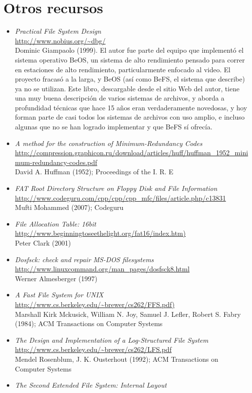 \documentclass[11pt,fleqn]{book} %
\newcommand{\otrorec}[1]{ \\ {\small \url{#1}} \\ }
\begin{document}
\section{Otros recursos}
\label{sec-7-4}
\label{FS_otros_recursos}


\begin{itemize}
\item \emph{Practical File System Design}
  \otrorec{http://www.nobius.org/~dbg/}
  Dominic Giampaolo (1999). El autor fue parte del equipo que
  implementó el sistema operativo BeOS, un sistema de alto rendimiento
  pensado para correr en estaciones de alto rendimiento,
  particularmente enfocado al video. El proyecto fracasó a la larga, y
  BeOS (así como BeFS, el sistema que describe) ya no se
  utilizan. Este libro, descargable desde el sitio Web del autor,
  tiene una muy buena descripción de varios sistemas de archivos, y
  aborda a profundidad técnicas que hace 15 años eran verdaderamente
  novedosas, y hoy forman parte de casi todos los sistemas de archivos
  con uso amplio, e incluso algunas que no se han logrado implementar
  y que BeFS sí ofrecía.
\item \emph{A method for the construction of Minimum-Redundancy Codes}
  \otrorec{http://compression.graphicon.ru/download/articles/huff/huffman_1952_minimum-redundancy-codes.pdf}
  David A. Huffman (1952); Proceedings of the I. R. E
\item \emph{FAT Root Directory Structure on Floppy Disk and File Information}
  \otrorec{http://www.codeguru.com/cpp/cpp/cpp_mfc/files/article.php/c13831}
  Mufti Mohammed (2007); Codeguru
\item \emph{File Allocation Table: 16bit}
  \otrorec{http://www.beginningtoseethelight.org/fat16/index.htm)}
  Peter Clark (2001)
\item \emph{Dosfsck: check and repair MS-DOS filesystems}
  \otrorec{http://www.linuxcommand.org/man_pages/dosfsck8.html}
  Werner Almesberger (1997)
\item \emph{A Fast File System for UNIX}
  \otrorec{http://www.cs.berkeley.edu/~brewer/cs262/FFS.pdf)}
  Marshall Kirk Mckusick, William N. Joy, Samuel J. Lefler, Robert
  S. Fabry (1984); ACM Transactions on Computer Systems
\item \emph{The Design and Implementation of a Log-Structured File System}
  \otrorec{http://www.cs.berkeley.edu/~brewer/cs262/LFS.pdf}
  Mendel Rosenblum, J. K. Ousterhout (1992); ACM Transactions on
  Computer Systems
\item \emph{The Second Extended File System: Internal Layout}

\end{itemize}
\end{document}
